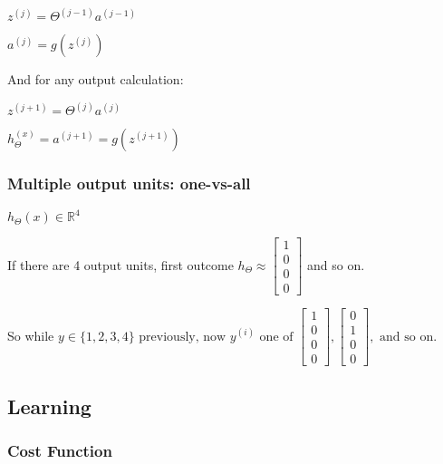\documentclass[12pt] {article}
\begin{document}
      $z^{(j)} = \Theta^{(j-1)}a^{(j-1)}$

      $a^{(j)} = g(z^{(j)})$

      And for any output calculation:

      $z^{(j+1)} = \Theta^{(j)}a^{(j)}$

      $h_\Theta^{(x)} = a^{(j+1)} = g(z^{(j+1)})$
    
    \subsubsection{Multiple output units: one-vs-all}

      $h_\Theta(x) \in \mathbb{R}^4$
      
      If there are 4 output units, first outcome $h_\Theta \approx 
      \begin{bmatrix} 1 \\ 0 \\ 0 \\ 0 \end{bmatrix}$ and so on. 

      So while $y \in\{1,2,3,4\} \text{ previously, now } y^{(i)} 
      \text{ one of } \begin{bmatrix} 1 \\ 0 \\ 0 \\ 0 \end{bmatrix},
      \begin{bmatrix} 0 \\ 1 \\ 0 \\ 0 \end{bmatrix}, \text{ and so on}.$

  \subsection{Learning}

    \subsubsection{Cost Function}
\end{document}
